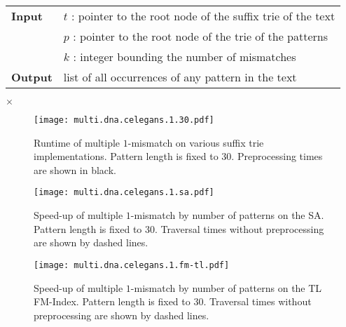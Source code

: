 \begin{figure*}[b]
\begin{center}
\begin{minipage}[t]{.8\textwidth}
\begin{algorithm}[H]
\begin{tabular}{ll}
\textbf{Input}  & $t$ : pointer to the root node of the suffix trie of the text\\
 			    & $p$ : pointer to the root node of the trie of the patterns\\
 			    & $k$ : integer bounding the number of mismatches\\
\textbf{Output} & list of all occurrences of any pattern in the text\\
\end{tabular}
\begin{algorithmic}[1]
\Else
		\State \Report {} $\times$ 
		\Repeat
			\Repeat
				\State {}
	\EndIf
\EndIf
\end{algorithmic}
\label{alg:st-hamming-multi}
\end{algorithm}
\end{minipage}
\end{center}
\end{figure*}

\begin{figure}[t]
\begin{center}
\caption[Multiple $k$-mismatches runtime]{Runtime of multiple $1$-mismatch on various suffix trie implementations. Pattern length is fixed to 30. Preprocessing times are shown in black.}
\label{fig:query-dna-apx-multi}
\texttt{[image: multi.dna.celegans.1.30.pdf]}
\end{center}
\end{figure}

\begin{figure}[t]
\begin{center}
\caption[Multiple $k$-mismatches speed-up on SA]{Speed-up of multiple $1$-mismatch by number of patterns on the SA. Pattern length is fixed to 30. Traversal times without preprocessing are shown by dashed lines.}
\label{fig:query-dna-apx-multi-sa}
\texttt{[image: multi.dna.celegans.1.sa.pdf]}
\end{center}
\end{figure}

\begin{figure}[b]
\begin{center}
\caption[Multiple $k$-mismatches speed-up on FM-index]{Speed-up of multiple $1$-mismatch by number of patterns on the TL FM-Index. Pattern length is fixed to 30. Traversal times without preprocessing are shown by dashed lines.}
\label{fig:query-dna-apx-multi-fmtl}
\texttt{[image: multi.dna.celegans.1.fm-tl.pdf]}
\end{center}
\end{figure}
